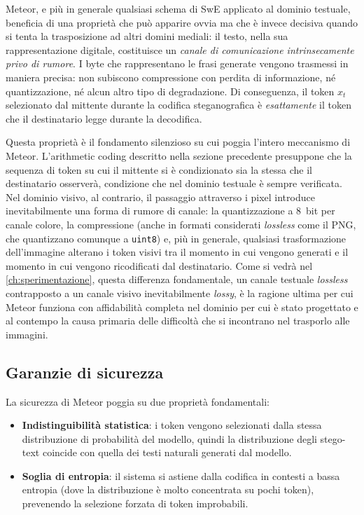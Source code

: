 Meteor, e più in generale qualsiasi schema di SwE applicato al dominio testuale, beneficia di una proprietà che può apparire ovvia ma che è invece decisiva quando si tenta la trasposizione ad altri domini mediali: il testo, nella sua rappresentazione digitale, costituisce un \emph{canale di comunicazione intrinsecamente privo di rumore}. I byte che rappresentano le frasi generate vengono trasmessi in maniera precisa: non subiscono compressione con perdita di informazione, né quantizzazione, né alcun altro tipo di degradazione. Di conseguenza, il token $x_t$ selezionato dal mittente durante la codifica steganografica è \emph{esattamente} il token che il destinatario legge durante la decodifica.

Questa proprietà è il fondamento silenzioso su cui poggia l'intero meccanismo di Meteor. L'arithmetic coding descritto nella sezione precedente presuppone che la sequenza di token su cui il mittente si è condizionato sia la stessa che il destinatario osserverà, condizione che nel dominio testuale è sempre verificata. Nel dominio visivo, al contrario, il passaggio attraverso i pixel introduce inevitabilmente una forma di rumore di canale: la quantizzazione a 8~bit per canale colore, la compressione (anche in formati considerati \textit{lossless} come il PNG, che quantizzano comunque a \texttt{uint8}) e, più in generale, qualsiasi trasformazione dell'immagine alterano i token visivi tra il momento in cui vengono generati e il momento in cui vengono ricodificati dal destinatario. Come si vedrà nel \autoref{ch:sperimentazione}, questa differenza fondamentale, un canale testuale \emph{lossless} contrapposto a un canale visivo inevitabilmente \emph{lossy}, è la ragione ultima per cui Meteor funziona con affidabilità completa nel dominio per cui è stato progettato e al contempo la causa primaria delle difficoltà che si incontrano nel trasporlo alle immagini.

\subsection{Garanzie di sicurezza}

La sicurezza di Meteor poggia su due proprietà fondamentali:

\begin{itemize}
	\item \textbf{Indistinguibilità statistica}: i token vengono selezionati dalla stessa distribuzione di probabilità del modello, quindi la distribuzione degli stego-text coincide con quella dei testi naturali generati dal modello.
	\item \textbf{Soglia di entropia}: il sistema si astiene dalla codifica in contesti a bassa entropia (dove la distribuzione è molto concentrata su pochi token), prevenendo la selezione forzata di token improbabili.
\end{itemize}


